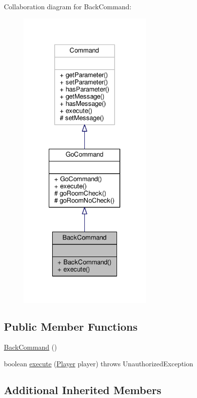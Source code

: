 Collaboration diagram for Back\-Command\-:
\nopagebreak
\begin{figure}[H]
\begin{center}
\leavevmode
\includegraphics[width=188pt]{classBackCommand__coll__graph}
\end{center}
\end{figure}
\subsection*{Public Member Functions}
\begin{DoxyCompactItemize}
\item 
\hyperlink{classBackCommand_a779456e24dfb281e5917e936da5fd901}{Back\-Command} ()
\item 
boolean \hyperlink{classBackCommand_a1f5b1ecc435b3b03d9d1a880c31c9c7a}{execute} (\hyperlink{classPlayer}{Player} player)  throws Unauthorized\-Exception 
\end{DoxyCompactItemize}
\subsection*{Additional Inherited Members}


